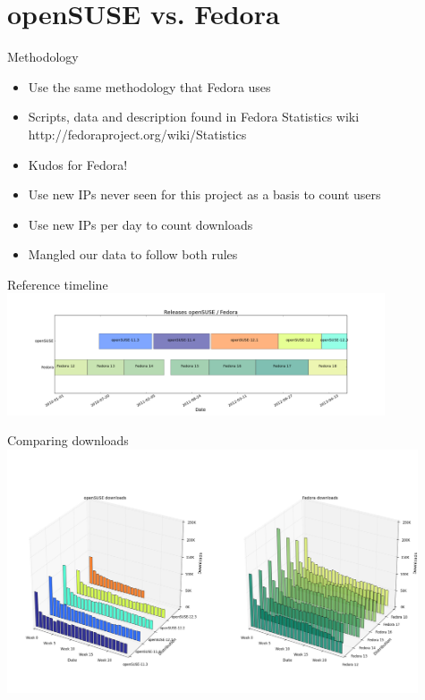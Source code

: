 \documentclass{beamer}
\begin{document}
\section{openSUSE vs. Fedora}

\begin{frame}{Methodology}
  \begin{itemize}
  \item Use the same methodology that Fedora uses
  \item Scripts, data and description found in Fedora Statistics wiki \newline
        http://fedoraproject.org/wiki/Statistics
  \item Kudos for Fedora!
  \item Use new IPs never seen for this project as a basis to count users
  \item Use new IPs per day to count downloads
  \item Mangled our data to follow both rules
  \end{itemize}
\end{frame}

\begin{frame}{Reference timeline}
  \includegraphics[height=3.6cm]{opensuse_fedora_timeline}
\end{frame}

\begin{frame}{Comparing downloads}
  \includegraphics[height=7.2cm]{opensuse_fedora_downloads}
\end{frame}
\end{document}
